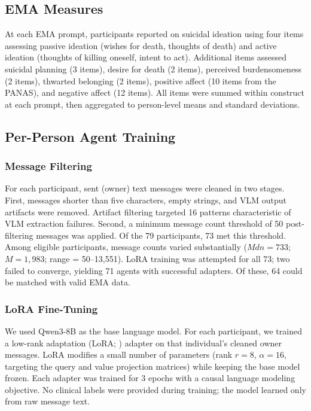 \documentclass[review,12pt,authoryear]{elsarticle}
\begin{document}
\subsection{EMA Measures}

At each EMA prompt, participants reported on suicidal ideation using four items assessing passive ideation (wishes for death, thoughts of death) and active ideation (thoughts of killing oneself, intent to act). Additional items assessed suicidal planning (3 items), desire for death (2 items), perceived burdensomeness (2 items), thwarted belonging (2 items), positive affect (10 items from the PANAS), and negative affect (12 items). All items were summed within construct at each prompt, then aggregated to person-level means and standard deviations.

\subsection{Per-Person Agent Training}

\subsubsection{Message Filtering}

For each participant, sent (owner) text messages were cleaned in two stages. First, messages shorter than five characters, empty strings, and VLM output artifacts were removed. Artifact filtering targeted 16 patterns characteristic of VLM extraction failures. Second, a minimum message count threshold of 50 post-filtering messages was applied. Of the 79 participants, 73 met this threshold. Among eligible participants, message counts varied substantially ($Mdn = 733$; $M = 1{,}983$; range = 50--13,551). LoRA training was attempted for all 73; two failed to converge, yielding 71 agents with successful adapters. Of these, 64 could be matched with valid EMA data.

\subsubsection{LoRA Fine-Tuning}

We used Qwen3-8B \citep{qwen2025qwen3} as the base language model. For each participant, we trained a low-rank adaptation (LoRA; \citealt{hu2022lora}) adapter on that individual's cleaned owner messages. LoRA modifies a small number of parameters (rank $r = 8$, $\alpha = 16$, targeting the query and value projection matrices) while keeping the base model frozen. Each adapter was trained for 3 epochs with a causal language modeling objective. No clinical labels were provided during training; the model learned only from raw message text.
\end{document}
